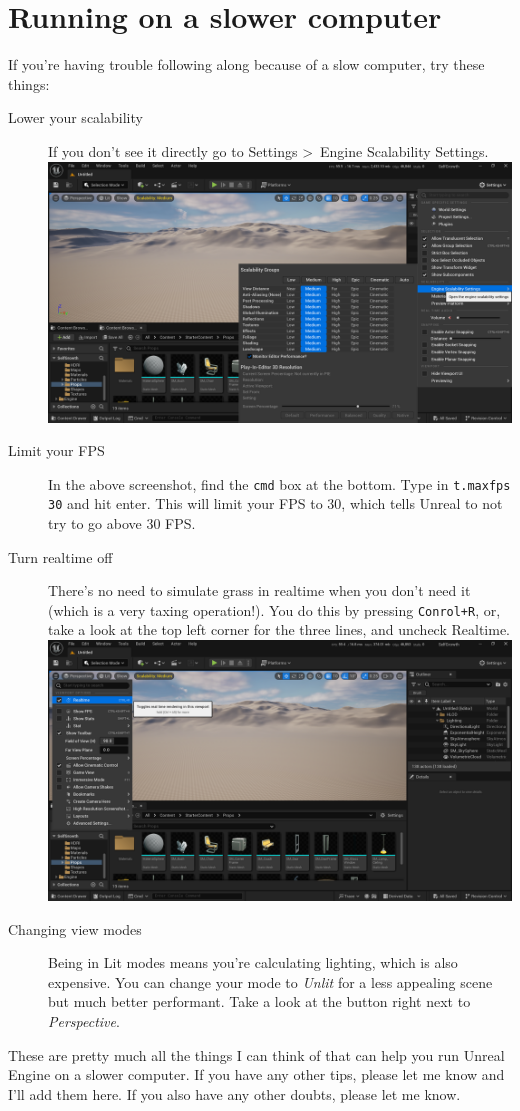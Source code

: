 \documentclass{article}
\begin{document}
\section{Running on a slower computer}
If you're having trouble following along because of a slow computer, try these things:
\begin{description}
    \item[Lower your scalability] If you don't see it directly go to Settings \textgreater\, Engine Scalability Settings. \\[10pt]\includegraphics[width=1\textwidth]{week1/image005.png}
    \item[Limit your FPS] In the above screenshot, find the \verb|cmd| box at the bottom. Type in \verb|t.maxfps 30| and hit enter. This will limit your FPS to 30, which tells Unreal to not try to go above 30 FPS.
    \item[Turn realtime off] There's no need to simulate grass in realtime when you don't need it (which is a very taxing operation!). You do this by pressing \verb|Conrol+R|, or, take a look at the top left corner for the three lines, and uncheck Realtime. \\[10pt]\includegraphics[width=1\textwidth]{week1/image006.png}
    \item[Changing view modes] Being in Lit modes means you're calculating lighting, which is also expensive. You can change your mode to \emph{Unlit} for a less appealing scene but much better performant. Take a look at the button right next to \emph{Perspective}.
\end{description}

These are pretty much all the things I can think of that can help you run Unreal Engine on a slower computer. If you have any other tips, please let me know and I'll add them here. If you also have any other doubts, please let me know.
\end{document}
